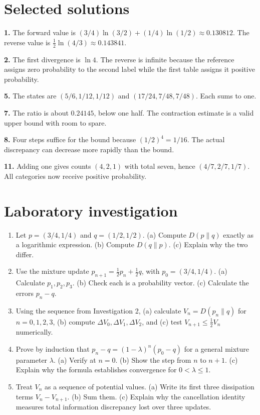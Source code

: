 \documentclass[11pt,oneside,openany]{book}
\theoremstyle{definition}
\theoremstyle{remark}
\numberwithin{equation}{chapter}
\providecommand{\tightlist}{\setlength{\itemsep}{0pt}\setlength{\parskip}{0pt}}
\newcommand{\labheading}{\FloatBarrier\section*{Laboratory investigation}\addcontentsline{toc}{section}{Laboratory investigation}}
\begin{document}
\section{Selected solutions}\label{ch06-selected-solutions}

\textbf{1.} The forward value is \((3/4)\ln(3/2)+(1/4)\ln(1/2)\approx0.130812\). The reverse value is \(\tfrac12\ln(4/3)\approx0.143841\).

\textbf{2.} The first divergence is \(\ln4\). The reverse is infinite because the reference assigns zero probability to the second label while the first table assigns it positive probability.

\textbf{5.} The states are \((5/6,1/12,1/12)\) and \((17/24,7/48,7/48)\). Each sums to one.

\textbf{7.} The ratio is about \(0.24145\), below one half. The contraction estimate is a valid upper bound with room to spare.

\textbf{8.} Four steps suffice for the bound because \((1/2)^4=1/16\). The actual discrepancy can decrease more rapidly than the bound.

\textbf{11.} Adding one gives counts \((4,2,1)\) with total seven, hence \((4/7,2/7,1/7)\). All categories now receive positive probability.
\labheading\begin{enumerate}
\def\labelenumi{\arabic{enumi}.}
\tightlist
\item
  Let \(p=(3/4,1/4)\) and \(q=(1/2,1/2)\). (a) Compute \(D(p\|q)\) exactly as a logarithmic expression. (b) Compute \(D(q\|p)\). (c) Explain why the two differ.
\item
  Use the mixture update \(p_{n+1}=\tfrac12p_n+\tfrac12q\), with \(p_0=(3/4,1/4)\). (a) Calculate \(p_1,p_2,p_3\). (b) Check each is a probability vector. (c) Calculate the errors \(p_n-q\).
\item
  Using the sequence from Investigation 2, (a) calculate \(V_n=D(p_n\|q)\) for \(n=0,1,2,3\), (b) compute \(\Delta V_0,\Delta V_1,\Delta V_2\), and (c) test \(V_{n+1}\leq\tfrac12 V_n\) numerically.
\item
  Prove by induction that \(p_n-q=(1-\lambda)^n(p_0-q)\) for a general mixture parameter \(\lambda\). (a) Verify at \(n=0\). (b) Show the step from \(n\) to \(n+1\). (c) Explain why the formula establishes convergence for \(0<\lambda\leq1\).
\item
  Treat \(V_n\) as a sequence of potential values. (a) Write its first three dissipation terms \(V_n-V_{n+1}\). (b) Sum them. (c) Explain why the cancellation identity measures total information discrepancy lost over three updates.
\end{enumerate}
\end{document}
